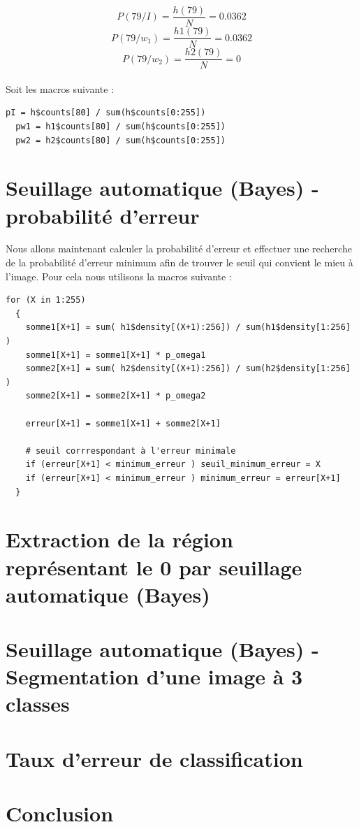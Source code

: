 \documentclass[a4paper,11pt]{article}
\begin{document}
  $$P(79/I) = \frac{h(79)}{N} = 0.0362$$
  $$P(79/w_1) = \frac{h1(79)}{N} = 0.0362$$
  $$P(79/w_2) = \frac{h2(79)}{N} = 0$$\\
  
  Soit les macros suivante : \\
  
  \begin{lstlisting}[caption=Macros de calcule de probabilité à priori des classe $N_{w_1}$ et $N_{w_2}$]
  pI = h$counts[80] / sum(h$counts[0:255])
  pw1 = h1$counts[80] / sum(h$counts[0:255])
  pw2 = h2$counts[80] / sum(h$counts[0:255])
  \end{lstlisting}

  
  \section{Seuillage automatique (Bayes) - probabilité d’erreur}
  Nous allons maintenant calculer la probabilité d'erreur et effectuer une recherche de la 
  probabilité d'erreur minimum afin de trouver le seuil qui convient le mieu à l'image.
  Pour cela nous utilisons la macros suivante :
  
  \begin{lstlisting}[caption=Macros de calcule de probabilité à priori des classe $N_{w_1}$ et $N_{w_2}$]
  for (X in 1:255) 
  { 
    somme1[X+1] = sum( h1$density[(X+1):256]) / sum(h1$density[1:256] )
    somme1[X+1] = somme1[X+1] * p_omega1  
    somme2[X+1] = sum( h2$density[(X+1):256]) / sum(h2$density[1:256] )
    somme2[X+1] = somme2[X+1] * p_omega2

    erreur[X+1] = somme1[X+1] + somme2[X+1]
    
    # seuil corrrespondant à l'erreur minimale
    if (erreur[X+1] < minimum_erreur ) seuil_minimum_erreur = X
    if (erreur[X+1] < minimum_erreur ) minimum_erreur = erreur[X+1]
  }
  \end{lstlisting}
  
  
  \section{Extraction de la région représentant le 0 par seuillage automatique (Bayes)}
  
  \section{Seuillage automatique (Bayes) - Segmentation d’une image à 3 classes}
  
  \section{Taux d’erreur de classification}
  
  \section*{Conclusion}
 
    
\end{document}
